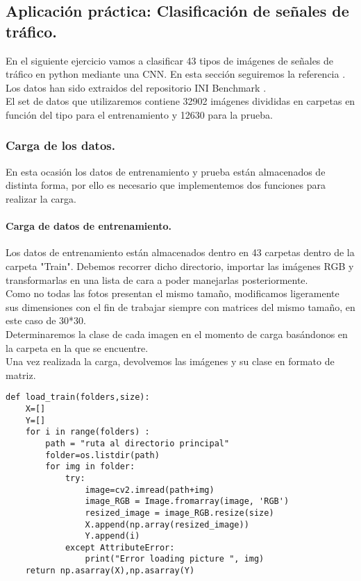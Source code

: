 \documentclass[a4paper,11pt]{article}
\begin{document}
\newpage

\subsection{Aplicación práctica: Clasificación de señales de tráfico.}
En el siguiente ejercicio vamos a clasificar 43 tipos de imágenes de señales de tráfico en python mediante una CNN. En esta sección seguiremos la referencia \cite{keras}. Los datos han sido extraidos del repositorio INI Benchmark \cite{ini}.\\

\noindent
El set de datos que utilizaremos contiene 32902 imágenes divididas en carpetas en función del tipo para el entrenamiento y 12630 para la prueba.
\subsubsection{Carga de los datos.}
En esta ocasión los datos de entrenamiento y prueba están almacenados de distinta forma, por ello es necesario que implementemos dos funciones para realizar la carga.
\paragraph{Carga de datos de entrenamiento.}
Los datos de entrenamiento están almacenados dentro en 43 carpetas dentro de la carpeta "Train". Debemos recorrer dicho directorio, importar las imágenes RGB y transformarlas en una lista de cara a poder manejarlas posteriormente.\\

\noindent
Como no todas las fotos presentan el mismo tamaño, modificamos ligeramente sus dimensiones con el fin de trabajar siempre con matrices del mismo tamaño, en este caso de 30*30.\\

\noindent
Determinaremos la clase de cada imagen en el momento de carga basándonos en la carpeta en la que se encuentre. \\

\noindent
Una vez realizada la carga, devolvemos las imágenes y su clase en formato de matriz.
\begin{lstlisting}
def load_train(folders,size):
    X=[]
    Y=[]
    for i in range(folders) :
        path = "ruta al directorio principal"
        folder=os.listdir(path)
        for img in folder:
            try:
                image=cv2.imread(path+img)
                image_RGB = Image.fromarray(image, 'RGB')
                resized_image = image_RGB.resize(size)
                X.append(np.array(resized_image))
                Y.append(i)
            except AttributeError:
                print("Error loading picture ", img)
    return np.asarray(X),np.asarray(Y)
\end{lstlisting}
\end{document}

